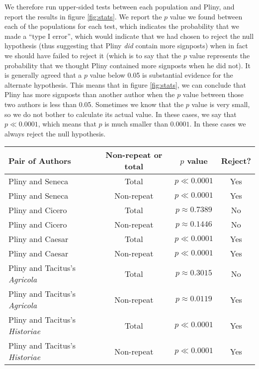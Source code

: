 We therefore run upper-sided tests between each population and Pliny, and report the results in figure \ref{fig:stats}. We report the $p$ value we found between each of the populations for each test, which indicates the probability that we made a ``type I error'', which would indicate that we had chosen to reject the null hypothesis (thus suggesting that Pliny \textit{did} contain more signposts) when in fact we should have failed to reject it (which is to say that the $p$ value represents the probability that we thought Pliny contained more signposts when he did not). It is generally agreed that a $p$ value below 0.05 is substantial evidence for the alternate hypothesis. This means that in figure \ref{fig:stats}, we can conclude that Pliny has more signposts than another author when the $p$ value between those two authors is less than 0.05. Sometimes we know that the $p$ value is very small, so we do not bother to calculate its actual value. In these cases, we say that $p \ll 0.0001$, which means that $p$ is much smaller than $0.0001$. In these cases we always reject the null hypothesis.

\begin{figure*}[t]
  \begin{center}
    \begin{tabular}{| l | c | c | c |}
      \hline
      Pair of Authors & Non-repeat or total & $p$ value & Reject? \\ \hline \hline
      Pliny and Seneca & Total & $p \ll 0.0001$ & Yes \\ \hline
      Pliny and Seneca & Non-repeat & $p \ll 0.0001$ & Yes \\ \hline
      Pliny and Cicero & Total & $p \approx 0.7389$ & No \\ \hline
      Pliny and Cicero & Non-repeat & $p \approx 0.1446$ & No \\ \hline
      Pliny and Caesar & Total & $p \ll 0.0001$ & Yes \\ \hline
      Pliny and Caesar & Non-repeat & $p \ll 0.0001$ & Yes \\ \hline
      Pliny and Tacitus's \textit{Agricola} & Total & $p \approx 0.3015$ & No \\ \hline
      Pliny and Tacitus's \textit{Agricola} & Non-repeat & $p \approx 0.0119$ & Yes \\ \hline
      Pliny and Tacitus's \textit{Historiae} & Total & $p \ll 0.0001$ & Yes \\ \hline
      Pliny and Tacitus's \textit{Historiae} & Non-repeat & $p \ll 0.0001$ & Yes \\      
      \hline
    \end{tabular}
  \end{center}
  \caption{\label{fig:stats}The results of the statistical analysis desrcibed in section \ref{sec:stats}.}
\end{figure*}

